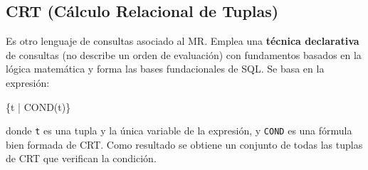 \subsection*{CRT (Cálculo Relacional de Tuplas)}
Es otro lenguaje de consultas asociado al MR. Emplea una \textbf{técnica declarativa} de consultas (no describe un orden de evaluación) con fundamentos basados en la lógica matemática y forma las bases fundacionales de SQL. Se basa en la expresión:
\begin{SQL}
    \{t | COND(t)\}
\end{SQL}
donde \texttt{t} es una tupla y la única variable de la expresión, y \texttt{COND} es una fórmula bien formada de CRT. Como resultado se obtiene un conjunto de todas las tuplas de CRT que verifican la condición.
